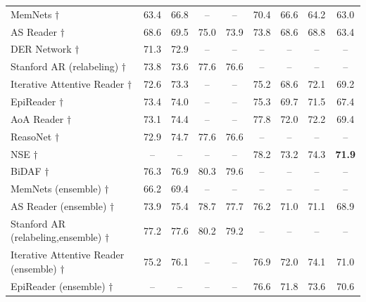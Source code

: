 \documentclass[11pt,a4paper]{article}
\begin{document}
\begin{table}[ht]
\begin{tabular}{@{}l|cc|cc|cc|cc@{}}
MemNets $\dagger$                  & 63.4                     & 66.8                      & --                        & --                         & 70.4                  & 66.6                   & 64.2                  & 63.0                  \\
AS Reader $\dagger$              & 68.6                     & 69.5                      & 75.0                     & 73.9                      & 73.8                  & 68.6                   & 68.8                  & 63.4                  \\
DER Network $\dagger$                                   & 71.3                     & 72.9                      & --                        & --                         & --                     & --                      & --                     & --                     \\ 
Stanford AR (relabeling) $\dagger$	& 	73.8	&	73.6	&	77.6	&	76.6	&	--	&	--	&	--	&	--	\\
Iterative Attentive Reader $\dagger$	&	72.6	&	73.3	&	--	&	--	&	75.2	&	68.6	&	72.1	&	69.2 \\
EpiReader $\dagger$	&	73.4	&	74.0	&	--	&	--	&	75.3	&	69.7	&	71.5	&	67.4 \\
AoA Reader $\dagger$ &	73.1	&	74.4	&	--	&	--	&	77.8	&	72.0	&	72.2	&	69.4	\\ 
ReasoNet $\dagger$ &	72.9	&	74.7	&	77.6	&	76.6	&	--	&	--	&	--	&	--	\\
NSE $\dagger$ &	--	&	--	&	--	&	--	&	78.2	&	73.2	&	74.3	&	\textbf{71.9} \\
BiDAF $\dagger$ &	76.3 & 76.9 & 80.3 & 79.6 &	--	&	--	&	--	&	--	\\ \midrule
MemNets (ensemble) $\dagger$                    & 66.2                     & 69.4                      & --                        & --                         & --                     & --                      & --                     & --                     \\ 
AS Reader (ensemble) $\dagger$                  & 73.9                     & 75.4                      & 78.7                     & 77.7             & 76.2                  & 71.0                   & 71.1                  & 68.9                  \\ 
Stanford AR (relabeling,ensemble) $\dagger$	& 	77.2	&	77.6	&	80.2	&	79.2	&	--	&	--	&	--	&	--	\\ 
Iterative Attentive Reader (ensemble) $\dagger$	&	75.2	&	76.1	&	--	&	--	&	76.9	&	72.0	&	74.1	&	71.0 \\ 
EpiReader (ensemble) $\dagger$	&	--	&	--	&	--	&	--	&	76.6	&	71.8	&	73.6	&	70.6 \\ \midrule

\end{tabular}
\end{table}
\end{document}
